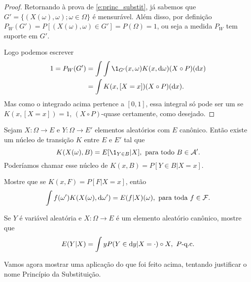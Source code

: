 \begin{proof}
  Retornando à prova de \eqref{e:princ_substit}, já sabemos que $G' = \{(X(\omega), \omega); \omega \in \Omega\}$ é mensurável.
  Além disso, por definição $P_W(G') = P[(X(\omega), \omega) \in G'] = P(\Omega) = 1$, ou seja a medida $P_W$ tem suporte em $G'$.

  Logo podemos escrever
  \begin{equation}
    \begin{split}
      1 = P_W(G') & = \int \int \1_{G'} (x, \omega) K(x, \d \omega) (X \circ P) (\d x)\\
      & = \int K(x, [X = x]) (X \circ P) (\d x).
    \end{split}
  \end{equation}
  Mas como o integrado acima pertence a $[0,1]$, essa integral só pode ser um se $K(x, [X = x]) = 1$, $(X \circ P)$-quase certamente, como desejado.
\end{proof}

\begin{exercise}
  Sejam $X: \Omega \to E$ e $Y: \Omega \to E'$ elementos aleatórios com $E$ canônico.
  Então existe um núcleo de transição $K$ entre $E$ e $E'$ tal que
  \begin{equation}
    \label{e:regular_cond_prob_givenX}
    K(X(\omega), B) = E[\1_{Y \in B} | X], \text{ para todo $B \in \mathcal{A}'$}.
  \end{equation}
  Poderíamos chamar esse núcleo de $K(x, B) = P[Y \in B | X = x]$.
\end{exercise}

\begin{exercise}
  Mostre que se $K(x, F) = P[F| X = x]$, então
  \begin{equation}
    \label{e:reg_cond_exp_givenX}
    \int f(\omega') K(X(\omega), \mathop{}\!\mathrm{d} \omega') = E(f | X)(\omega), \text{ para toda $f \in \mathcal{F}$}.
  \end{equation}
\end{exercise}

\begin{exercise}
  Se $Y$ é variável aleatória e $X: \Omega \to E$ é um elemento aleatório canônico, mostre que
  \begin{equation}
    E(Y|X) = \int y P(Y \in \mathop{}\!\mathrm{d} y|X = \cdot) \circ X, \text{ $P$-q.c.}
  \end{equation}
\end{exercise}

Vamos agora mostrar uma aplicação do que foi feito acima, tentando justificar o nome Princípio da Substituição.

